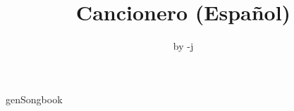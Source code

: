 \documentclass[11pt,a4paper,openany]{book}  %
\begin{document}
\Large

\title{Cancionero (Español)}
\author{by -j} 

\maketitle
\cleardoublepage
\tableofcontents
\newpage  %


genSongbook

\printindex[song]
\end{document}
